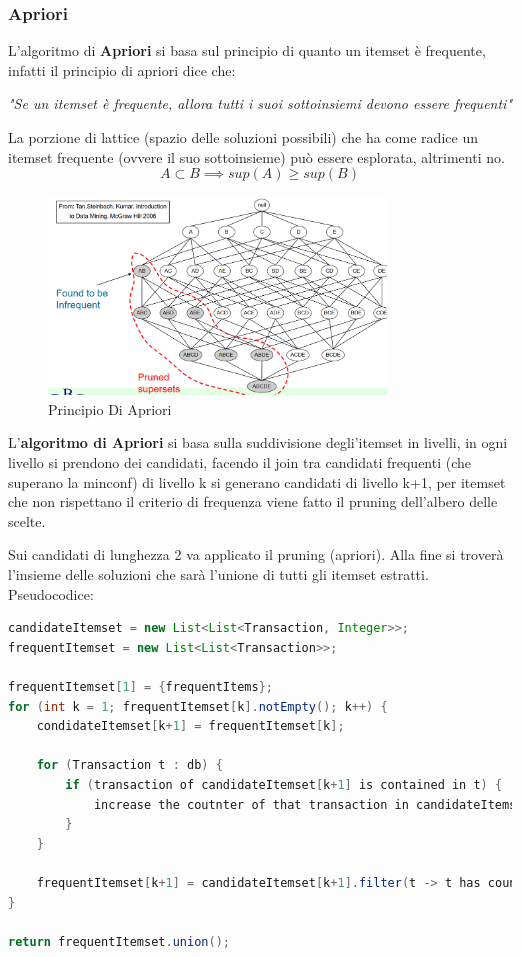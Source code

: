 \documentclass[12pt]{article}
\begin{document}
\subsubsection{Apriori}
L'algoritmo di \textbf{Apriori} si basa sul principio di quanto un itemset \`e frequente, infatti il principio di apriori dice che:
\begin{center}
\emph{"Se un itemset \`e frequente, allora tutti i suoi sottoinsiemi devono essere frequenti"}
\end{center}
La porzione di lattice (spazio delle soluzioni possibili) che ha come radice un itemset frequente (ovvere il suo sottoinsieme) pu\`o essere esplorata, altrimenti no.
\[ A \subset B \implies sup(A) \geqslant  sup(B) \]
\begin{figure}[H]
    \centering
    \includegraphics[width=0.8\textwidth]{principio-di-apriori.png}
    \caption{Principio Di Apriori}
    \label{fig:principio-di-apriori}
\end{figure}
L'\textbf{algoritmo di Apriori} si basa sulla suddivisione degli'itemset in  livelli, in ogni livello si prendono dei candidati, facendo il join tra candidati frequenti (che superano la minconf) di livello k si generano candidati di livello k+1, per itemset che non rispettano il criterio di frequenza viene fatto il pruning dell'albero delle scelte.

Sui candidati di lunghezza 2 va applicato il pruning (apriori). Alla fine si trover\`a l'insieme delle soluzioni che sar\`a l'unione di tutti gli itemset estratti. Pseudocodice:
\begin{lstlisting}[language=java]
candidateItemset = new List<List<Transaction, Integer>>;
frequentItemset = new List<List<Transaction>>;

frequentItemset[1] = {frequentItems};
for (int k = 1; frequentItemset[k].notEmpty(); k++) {
    condidateItemset[k+1] = frequentItemset[k];

    for (Transaction t : db) {
        if (transaction of candidateItemset[k+1] is contained in t) {
            increase the coutnter of that transaction in candidateItemset[k+1];
        }
    }

    frequentItemset[k+1] = candidateItemset[k+1].filter(t -> t has count greater than minsup);
}

return frequentItemset.union();
\end{lstlisting}
\end{document}
